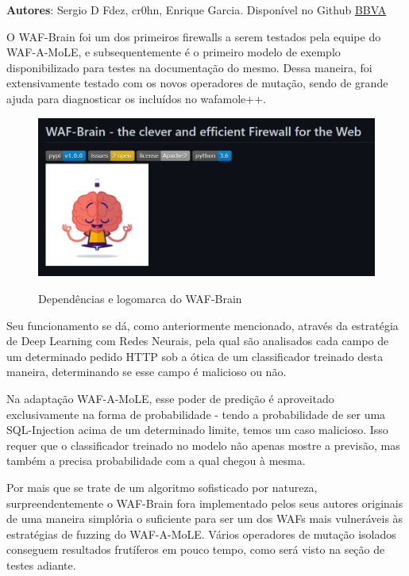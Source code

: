 \textbf{Autores}: Sergio D Fdez, cr0hn, Enrique Garcia. Disponível no Github \href{https://github.com/BBVA}{BBVA}

O WAF-Brain foi um dos primeiros firewalls a serem testados pela equipe do WAF-A-MoLE, e subsequentemente é o primeiro modelo de exemplo disponibilizado para testes na documentação do mesmo. Dessa maneira, foi extensivamente testado com os novos operadores de mutação, sendo de grande ajuda para diagnosticar os incluídos no wafamole++.

\begin{figure}[ht]
    \centering
    \caption{Dependências e logomarca do WAF-Brain}
    \includegraphics[width=12.5cm]{figuras/WAFBrain.png} 
    \label{fig:internet} 
\end{figure}

Seu funcionamento se dá, como anteriormente mencionado, através da estratégia de Deep Learning com Redes Neurais, pela qual são analisados cada campo de um determinado pedido HTTP sob a ótica de um classificador treinado desta maneira, determinando se esse campo é malicioso ou não.

Na adaptação WAF-A-MoLE, esse poder de predição é aproveitado exclusivamente na forma de probabilidade - tendo a probabilidade de ser uma SQL-Injection acima de um determinado limite, temos um caso malicioso. Isso requer que o classificador treinado no modelo não apenas mostre a previsão, mas também a precisa probabilidade com a qual chegou à mesma.

Por mais que se trate de um algoritmo sofisticado por natureza, surpreendentemente o WAF-Brain fora implementado pelos seus autores originais de uma maneira simplória o suficiente para ser um dos WAFs mais vulneráveis às estratégias de fuzzing do WAF-A-MoLE. Vários operadores de mutação isolados conseguem resultados frutíferos em pouco tempo, como será visto na seção de testes adiante.

